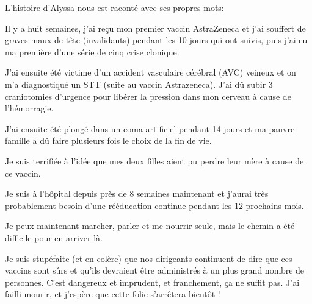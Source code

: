 L'histoire d'Alyssa nous est raconté avec ses propres mots:

Il y a huit semaines, j'ai reçu mon premier vaccin AstraZeneca et j'ai souffert
de graves maux de tête (invalidants) pendant les 10 jours qui ont suivis, puis
j'ai eu ma première d'une série de cinq crise clonique.

J'ai ensuite été victime d'un accident vasculaire cérébral (AVC) veineux et on
m'a diagnostiqué un STT (suite au vaccin Astrazeneca). J'ai dû subir 3
craniotomies d'urgence pour libérer la pression dans mon cerveau à cause de
l'hémorragie.

J'ai ensuite été plongé dans un coma artificiel pendant 14 jours et ma pauvre
famille a dû faire plusieurs fois le choix de la fin de vie.

Je suis terrifiée à l'idée que mes deux filles aient pu perdre leur mère à cause
de ce vaccin.

Je suis à l'hôpital depuis près de 8 semaines maintenant et j'aurai très
probablement besoin d'une rééducation continue pendant les 12 prochains mois.

Je peux maintenant marcher, parler et me nourrir seule, mais le chemin a été
difficile pour en arriver là.

Je suis stupéfaite (et en colère) que nos dirigeants continuent de dire que ces
vaccins sont sûrs et qu'ils devraient être administrés à un plus grand nombre de
personnes. C'est dangereux et imprudent, et franchement, ça ne suffit pas. J'ai
failli mourir, et j'espère que cette folie s'arrêtera bientôt !

